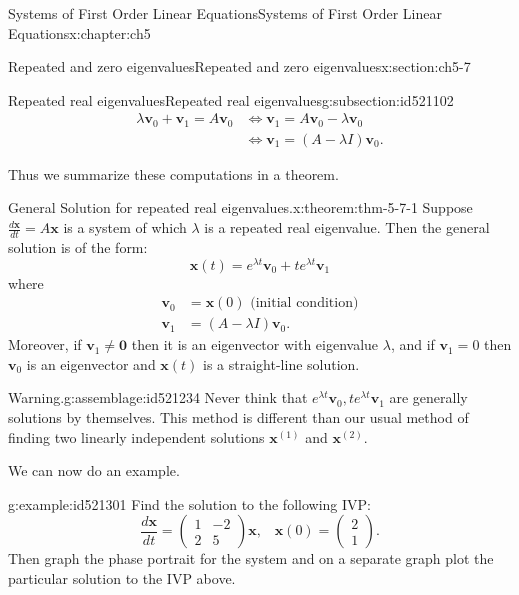 \documentclass[oneside,10pt,]{book}
\numberwithin{equation}{section}
\numberwithin{equation}{section}
\newcommand{\amp}{&}
\begin{document}
\begin{chapterptx}{Systems of First Order Linear Equations}{}{Systems of First Order Linear Equations}{}{}{x:chapter:ch5}
\begin{sectionptx}{Repeated and zero eigenvalues}{}{Repeated and zero eigenvalues}{}{}{x:section:ch5-7}
\begin{subsectionptx}{Repeated real eigenvalues}{}{Repeated real eigenvalues}{}{}{g:subsection:id521102}
\begin{align*}
\lambda\mathbf{v}_{0}+\mathbf{v}_{1}=A\mathbf{v}_{0} \amp \iff  \mathbf{v}_{1}=A\mathbf{v}_{0}-\lambda\mathbf{v}_{0}\\
\amp \iff  \mathbf{v}_{1}=\left(A-\lambda I\right)\mathbf{v}_{0}.
\end{align*}
%
\par
Thus we summarize these computations in a theorem.%
\begin{theorem}{General Solution for repeated real eigenvalues.}{}{x:theorem:thm-5-7-1}%
Suppose \(\frac{d\mathbf{x}}{dt}=A\mathbf{x}\) is a system of which \(\lambda\) is a repeated real eigenvalue. Then the general solution is of the form:%
\begin{equation*}
\mathbf{x}(t)=e^{\lambda t}\mathbf{v}_{0}+te^{\lambda t}\mathbf{v}_{1}
\end{equation*}
where%
\begin{align*}
\mathbf{v}_{0} \amp =\mathbf{x}(0)\text{ (initial condition)}\\
\mathbf{v}_{1} \amp =\left(A-\lambda I\right)\mathbf{v}_{0}.
\end{align*}
Moreover, if \(\mathbf{v}_{1}\neq\mathbf{0}\) then it is an eigenvector with eigenvalue \(\lambda\), and if \(\mathbf{v}_{1}=0\) then \(\mathbf{v}_{0}\) is an eigenvector and \(\mathbf{x}(t)\) is a straight-line solution.%
\end{theorem}
\begin{assemblage}{Warning.}{g:assemblage:id521234}%
Never think that \(e^{\lambda t}\mathbf{v}_{0},te^{\lambda t}\mathbf{v}_{1}\) are generally solutions by themselves. This method is different than our usual method of finding two linearly independent solutions \(\mathbf{x}^{(1)}\) and \(\mathbf{x}^{(2)}\).%
\end{assemblage}
We can now do an example.%
\begin{example}{}{g:example:id521301}%
Find the solution to the following IVP:%
\begin{equation*}
\frac{d\mathbf{x}}{dt}=\left(\begin{array}{cc}
1 \amp -2\\
2 \amp 5
\end{array}\right)\mathbf{x},\,\,\,\,\,\mathbf{x}(0)=\left(\begin{array}{c}
2\\
1
\end{array}\right).
\end{equation*}
Then graph the phase portrait for the system and on a separate graph plot the particular solution to the IVP above.%

\end{example}
\end{subsectionptx}
\end{sectionptx}
\end{chapterptx}
\end{document}
